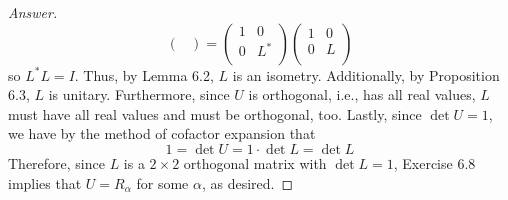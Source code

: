 \documentclass[../psets.tex]{subfiles}
\begin{document}
\begin{enumerate}[label={\textbf{6.\arabic*.}}]
\begin{enumerate}
\begin{proof}[Answer]
\begin{equation*}
\begin{pmatrix}
                \end{pmatrix}
                =
                \begin{pmatrix}
                    1 & 0\\
                    0 & L^*\\
                \end{pmatrix}
                \begin{pmatrix}
                    1 & 0\\
                    0 & L\\
                \end{pmatrix}
            \end{equation*}
            so $L^*L=I$. Thus, by Lemma 6.2, $L$ is an isometry. Additionally, by Proposition 6.3, $L$ is unitary. Furthermore, since $U$ is orthogonal, i.e., has all real values, $L$ must have all real values and must be orthogonal, too. Lastly, since $\det U=1$, we have by the method of cofactor expansion that
            \begin{equation*}
                1 = \det U = 1\cdot\det L = \det L
            \end{equation*}
            Therefore, since $L$ is a $2\times 2$ orthogonal matrix with $\det L=1$, Exercise 6.8 implies that $U=R_\alpha$ for some $\alpha$, as desired.
        \end{proof}
    \end{enumerate}
\end{enumerate}
\end{document}
